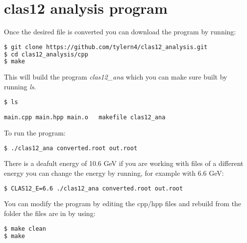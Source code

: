 \documentclass[a4paper]{article}
\begin{document}
\section{clas12 analysis program}
Once the desired file is converted you can download the program by running:

\begin{lstlisting}[language=bash]
$ git clone https://github.com/tylern4/clas12_analysis.git
$ cd clas12_analysis/cpp
$ make
\end{lstlisting}

This will build the program \emph{clas12\_ana} which you can make sure built by running \emph{ls}.

\begin{lstlisting}[language=bash]
$ ls 

main.cpp main.hpp main.o   makefile clas12_ana
\end{lstlisting}

To run the program:
\begin{lstlisting}[language=bash]
$ ./clas12_ana converted.root out.root
\end{lstlisting}

There is a deafult energy of 10.6 GeV if you are working with files of a different energy you can change the energy by running, for example with 6.6 GeV:
\begin{lstlisting}[language=bash]
$ CLAS12_E=6.6 ./clas12_ana converted.root out.root
\end{lstlisting}

You can modify the program by editing the cpp/hpp files and rebuild from the folder the files are in by using:
\begin{lstlisting}[language=bash]
$ make clean
$ make
\end{lstlisting}
\end{document}
